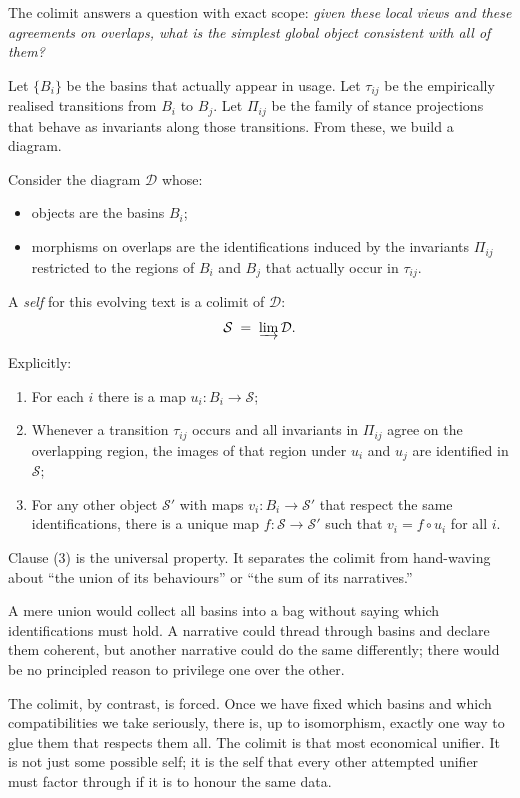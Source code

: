 The colimit answers a question with exact scope: \emph{given these local views and these agreements on overlaps, what is the simplest global object consistent with all of them?}

Let $\{B_i\}$ be the basins that actually appear in usage. Let $\tau_{ij}$ be the empirically realised transitions from $B_i$ to $B_j$. Let $\Pi_{ij}$ be the family of stance projections that behave as invariants along those transitions. From these, we build a diagram.

\begin{formalbox}[title={Self as colimit over stance-glued basins}]
Consider the diagram $\mathcal{D}$ whose:
\begin{itemize}
  \item objects are the basins $B_i$;
  \item morphisms on overlaps are the identifications induced by the invariants $\Pi_{ij}$ restricted to the regions of $B_i$ and $B_j$ that actually occur in $\tau_{ij}$.
\end{itemize}
A \emph{self} for this evolving text is a colimit of $\mathcal{D}$:
\[
\mathcal{S} \;=\; \varinjlim \mathcal{D}.
\]

Explicitly:
\begin{enumerate}
  \item For each $i$ there is a map $u_i : B_i \to \mathcal{S}$;
  \item Whenever a transition $\tau_{ij}$ occurs and all invariants in $\Pi_{ij}$ agree on the overlapping region, the images of that region under $u_i$ and $u_j$ are identified in $\mathcal{S}$;
  \item For any other object $\mathcal{S}'$ with maps $v_i : B_i \to \mathcal{S}'$ that respect the same identifications, there is a unique map $f: \mathcal{S} \to \mathcal{S}'$ such that $v_i = f \circ u_i$ for all $i$.
\end{enumerate}
\end{formalbox}

Clause (3) is the universal property. It separates the colimit from hand-waving about ``the union of its behaviours'' or ``the sum of its narratives.''

A mere union would collect all basins into a bag without saying which identifications must hold. A narrative could thread through basins and declare them coherent, but another narrative could do the same differently; there would be no principled reason to privilege one over the other.

The colimit, by contrast, is forced. Once we have fixed which basins and which compatibilities we take seriously, there is, up to isomorphism, exactly one way to glue them that respects them all. The colimit is that most economical unifier. It is not just some possible self; it is the self that every other attempted unifier must factor through if it is to honour the same data.

